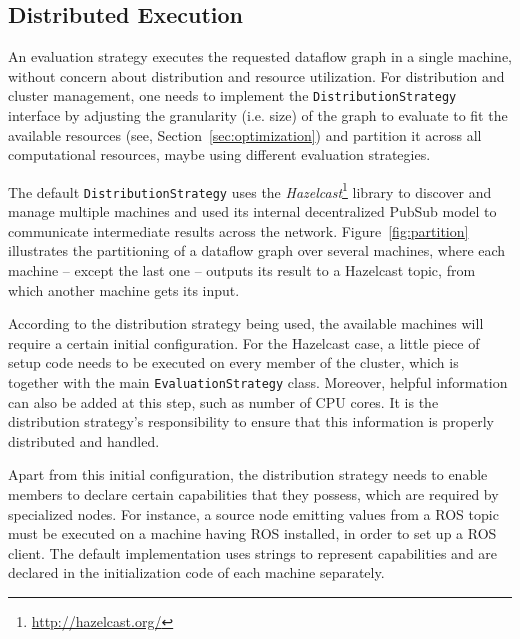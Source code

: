 \documentclass[sigplan,screen]{acmart}
\begin{document}
\subsection{Distributed Execution} \label{sec:distributed}

An evaluation strategy executes the requested dataflow graph in a single
machine, without concern about distribution and resource utilization.
%
For distribution and cluster management, one needs to implement
the \texttt{DistributionStrategy} interface by adjusting the granularity (i.e. size) of
the graph to evaluate to fit the available resources (see, Section~\ref{sec:optimization})
and partition it across all computational resources, maybe using different evaluation strategies.

The default \texttt{DistributionStrategy} uses the \textit{Hazelcast}\footnote{\url{http://hazelcast.org/}}
library to discover and manage multiple machines and used its internal decentralized PubSub model
to communicate intermediate results across the network. Figure~\ref{fig:partition}
illustrates the partitioning of a dataflow graph over several machines, where each
machine -- except the last one -- outputs its result to a Hazelcast topic,
from which another machine gets its input.
%

According to the distribution strategy being used, the available machines will
require a certain initial configuration. For the Hazelcast case, a
little piece of setup code needs to be executed on every member of the cluster,
which is together with the main \texttt{EvaluationStrategy} class. Moreover, helpful
information can also be added at this step, such as number of CPU cores. It is
the distribution strategy's responsibility to ensure that this information is
properly distributed and handled.

Apart from this initial configuration, the distribution strategy needs to enable
members to declare certain capabilities that they possess, which are required by
specialized nodes. For instance, a source node emitting values from a ROS topic
must be executed on a machine having ROS installed, in order to set up a ROS
client. The default implementation uses strings to represent capabilities and
are declared in the initialization code of each machine separately.
\end{document}
